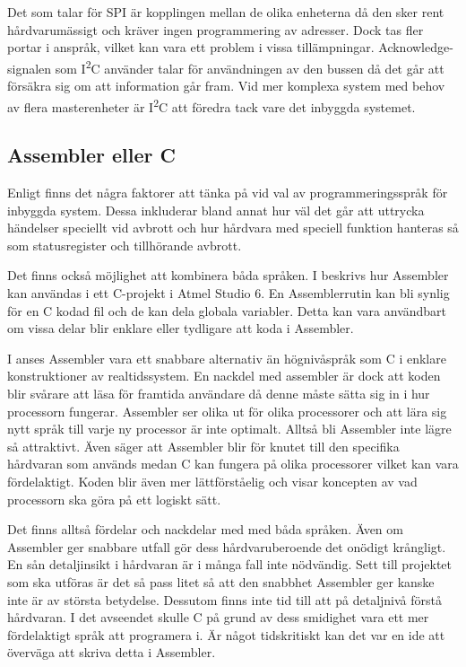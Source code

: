 \documentclass[11pt]{article}
\begin{document}
\begin{flushleft}
Det som talar för SPI är kopplingen mellan de olika enheterna då den sker rent hårdvarumässigt och kräver ingen programmering av adresser. Dock tas fler portar i anspråk, vilket kan vara ett problem i vissa tillämpningar. Acknowledge-signalen som I\textsuperscript{2}C använder talar för användningen av den bussen då det går att försäkra sig om att information går fram. Vid mer komplexa system med behov av flera masterenheter är I\textsuperscript{2}C att föredra tack vare det inbyggda systemet. 

\subsection{Assembler eller C}

Enligt \cite{CPC} finns det några faktorer att tänka på vid val av programmeringsspråk för inbyggda system. Dessa inkluderar bland annat hur väl det går att uttrycka händelser speciellt vid avbrott och hur hårdvara med speciell funktion hanteras så som statusregister och tillhörande avbrott.  

Det finns också möjlighet att kombinera båda språken. I \cite{AssC} beskrivs hur Assembler kan användas i ett C-projekt i Atmel Studio 6. En Assemblerrutin kan bli synlig för en C kodad fil och de kan dela globala variabler. Detta kan vara användbart om vissa delar blir enklare eller tydligare att koda i Assembler.

I \cite{RWD} anses Assembler vara ett snabbare alternativ än högnivåspråk som C i enklare konstruktioner av realtidssystem. En nackdel med assembler är dock att koden blir svårare att läsa för framtida användare då denne måste sätta sig in i hur processorn fungerar. Assembler ser olika ut för olika processorer och att lära sig nytt språk till varje ny processor är inte optimalt.  Alltså bli Assembler inte lägre så attraktivt. Även \cite{CPM} säger att Assembler blir för knutet till den specifika hårdvaran som används medan C kan fungera på olika processorer vilket kan vara fördelaktigt. Koden blir även mer lättförståelig och visar koncepten av vad processorn ska göra på ett logiskt sätt. 

Det finns alltså fördelar och nackdelar med med båda språken. Även om Assembler ger snabbare utfall gör dess hårdvaruberoende det onödigt krångligt. En sån detaljinsikt i hårdvaran är i många fall inte nödvändig. Sett till projektet som ska utföras är det så pass litet så att den snabbhet Assembler ger kanske inte är av största betydelse. Dessutom finns inte tid till att på detaljnivå förstå hårdvaran. I det avseendet skulle C på grund av dess smidighet vara ett mer fördelaktigt språk att programera i. Är något tidskritiskt kan det var en ide att överväga att skriva detta i Assembler. 


\end{flushleft}
\end{document}
